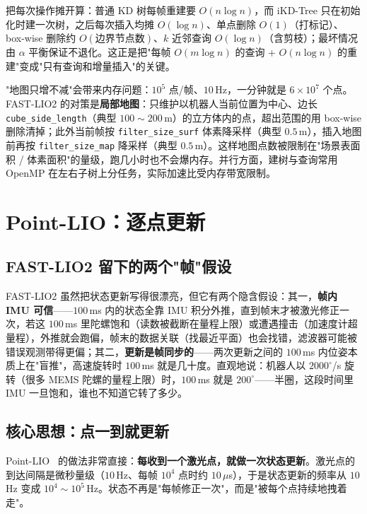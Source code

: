 把每次操作摊开算：普通 KD 树每帧重建要 $O(n\log n)$，而 iKD-Tree 只在初始化时建一次树，之后每次插入均摊 $O(\log n)$、单点删除 $O(1)$（打标记）、box-wise 删除约 $O(\text{边界节点数})$、$k$ 近邻查询 $O(\log n)$（含剪枝）；最坏情况由 $\alpha$ 平衡保证不退化。这正是把"每帧 $O(m\log n)$ 的查询 + $O(n\log n)$ 的重建"变成"只有查询和增量插入"的关键。

"地图只增不减"会带来内存问题：$10^5$ 点/帧、$10$\,Hz，一分钟就是 $6\times10^7$ 个点。FAST-LIO2 的对策是\textbf{局部地图}：只维护以机器人当前位置为中心、边长 \texttt{cube\_side\_length}（典型 $100\sim200$\,m）的立方体内的点，超出范围的用 box-wise 删除清掉；此外当前帧按 \texttt{filter\_size\_surf} 体素降采样（典型 $0.5$\,m），插入地图前再按 \texttt{filter\_size\_map} 降采样（典型 $0.5$\,m）。这样地图点数被限制在"场景表面积 / 体素面积"的量级，跑几小时也不会爆内存。并行方面，建树与查询常用 OpenMP 在左右子树上分任务，实际加速比受内存带宽限制。

\section{Point-LIO：逐点更新}\label{sec:17-pointlio}

\subsection{FAST-LIO2 留下的两个"帧"假设}

FAST-LIO2 虽然把状态更新写得很漂亮，但它有两个隐含假设：其一，\textbf{帧内 IMU 可信}——$100$\,ms 内的状态全靠 IMU 积分外推，直到帧末才被激光修正一次，若这 $100$\,ms 里陀螺饱和（读数被截断在量程上限）或遭遇撞击（加速度计超量程），外推就会跑偏，帧末的数据关联（找最近平面）也会找错，滤波器可能被错误观测带得更偏；其二，\textbf{更新是帧同步的}——两次更新之间的 $100$\,ms 内位姿本质上在"盲推"，高速旋转时 $100$\,ms 就是几十度。直观地说：机器人以 $2000^{\circ}$/s 旋转（很多 MEMS 陀螺的量程上限）时，$100$\,ms 就是 $200^{\circ}$——半圈，这段时间里 IMU 一旦饱和，谁也不知道它转了多少。

\subsection{核心思想：点一到就更新}

Point-LIO~\cite{he2023pointlio} 的做法非常直接：\textbf{每收到一个激光点，就做一次状态更新}。激光点的到达间隔是微秒量级（$10$\,Hz、每帧 $10^4$ 点时约 $10\,\mu$s），于是状态更新的频率从 $10$\,Hz 变成 $10^4\sim10^5$\,Hz。状态不再是"每帧修正一次"，而是"被每个点持续地拽着走"。

